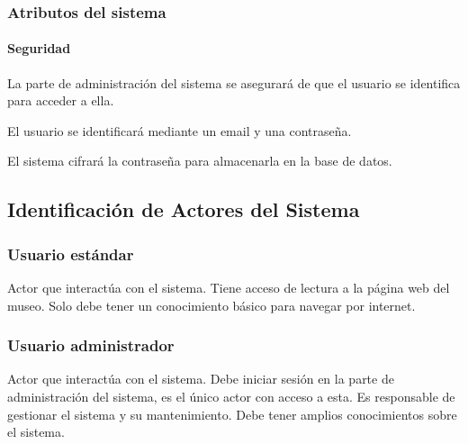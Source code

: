 \subsubsection{Atributos del sistema}

\paragraph*{Seguridad}
\begin{myEnumSEG}
	\item La parte de administración del sistema se asegurará de que el usuario se identifica para acceder a ella.
	\begin{myEnumSEG}
		\item El usuario se identificará mediante un email y una contraseña.
	\end{myEnumSEG}
	\item El sistema cifrará la contraseña para almacenarla en la base de datos.
\end{myEnumSEG}


\subsection{Identificación de Actores del Sistema} 
\subsubsection{Usuario estándar}
Actor que interactúa con el sistema. Tiene acceso de lectura a la página web del museo. Solo debe tener un conocimiento básico para navegar por internet.
\subsubsection{Usuario administrador}
Actor que interactúa con el sistema. Debe iniciar sesión en la parte de administración del sistema, es el único actor con acceso a esta. Es responsable de gestionar el sistema y su mantenimiento. Debe tener amplios conocimientos sobre el sistema.

